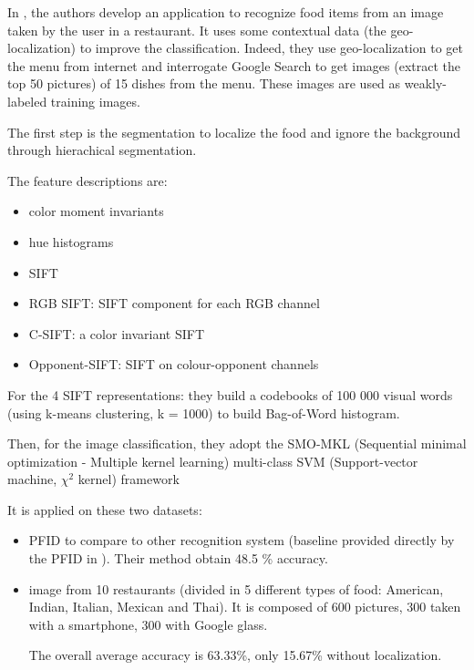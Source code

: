 In \cite{Bettadapura2015}, the authors develop an application to recognize food items from an image taken by the user in a restaurant. It uses some contextual data (the geo-localization) to improve the classification.
Indeed, they use geo-localization to get the menu from internet and interrogate Google Search to get images (extract the top 50 pictures) of 15 dishes from the menu. These images are used as weakly-labeled training images.

The first step is the segmentation to localize the food and ignore the background through hierachical segmentation.

The feature descriptions are:
\begin{itemize}
    \item color moment invariants
    \item hue histograms
    \item SIFT
    \item RGB SIFT: SIFT component for each RGB channel
    \item C-SIFT: a color invariant SIFT
    \item Opponent-SIFT: SIFT on colour-opponent channels
\end{itemize}

For the 4 SIFT representations: they build a codebooks of 100 000 visual words (using k-means clustering, k = 1000) to build Bag-of-Word histogram.

Then, for the image classification, they adopt the SMO-MKL (Sequential minimal optimization - Multiple kernel learning) multi-class SVM (Support-vector machine, $\chi^2$ kernel) framework

It is applied on these two datasets:
\begin{itemize}
    \item PFID to compare to other recognition system (baseline provided directly by the PFID in \cite{Chen2009}). Their method obtain 48.5 \% accuracy.
    
    \item image from 10 restaurants (divided in 5 different types of food: American, Indian, Italian, Mexican and Thai). It is composed of 600 pictures, 300 taken with a smartphone, 300 with Google glass.
    
    The overall average accuracy is 63.33\%, only 15.67\% without localization.
\end{itemize}
